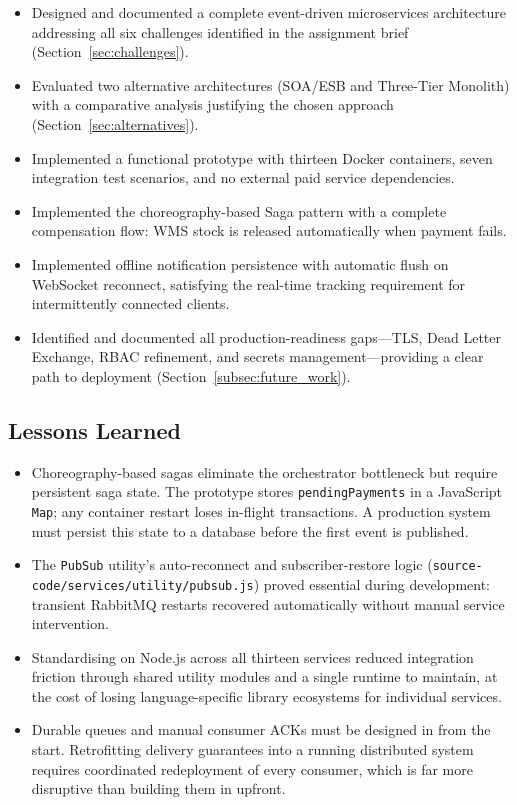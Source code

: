 \begin{itemize}
  \item Designed and documented a complete event-driven microservices architecture
        addressing all six challenges identified in the assignment brief
        (Section~\ref{sec:challenges}).
  \item Evaluated two alternative architectures (SOA/ESB and Three-Tier Monolith)
        with a comparative analysis justifying the chosen approach
        (Section~\ref{sec:alternatives}).
  \item Implemented a functional prototype with thirteen Docker containers, seven
        integration test scenarios, and no external paid service dependencies.
  \item Implemented the choreography-based Saga pattern with a complete compensation
        flow: WMS stock is released automatically when payment fails.
  \item Implemented offline notification persistence with automatic flush on
        WebSocket reconnect, satisfying the real-time tracking requirement for
        intermittently connected clients.
  \item Identified and documented all production-readiness gaps---TLS, Dead Letter
        Exchange, RBAC refinement, and secrets management---providing a clear path
        to deployment (Section~\ref{subsec:future_work}).
\end{itemize}

\subsection{Lessons Learned}

\begin{itemize}
  \item Choreography-based sagas eliminate the orchestrator bottleneck but require
        persistent saga state. The prototype stores \texttt{pendingPayments} in a
        JavaScript \texttt{Map}; any container restart loses in-flight transactions.
        A production system must persist this state to a database before the first
        event is published.
  \item The \texttt{PubSub} utility's auto-reconnect and subscriber-restore logic
        (\texttt{source-code/services/utility/pubsub.js}) proved essential during
        development: transient RabbitMQ restarts recovered automatically without
        manual service intervention.
  \item Standardising on Node.js across all thirteen services reduced integration
        friction through shared utility modules and a single runtime to maintain,
        at the cost of losing language-specific library ecosystems for individual services.
  \item Durable queues and manual consumer ACKs must be designed in from the
        start. Retrofitting delivery guarantees into a running distributed system
        requires coordinated redeployment of every consumer, which is far more
        disruptive than building them in upfront.
\end{itemize}

